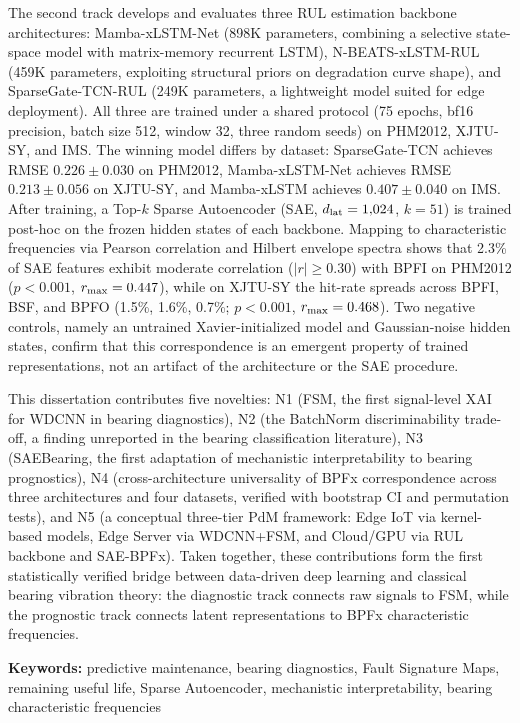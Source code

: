 \begin{abstracten}
The second track develops and evaluates three RUL estimation backbone
architectures: Mamba-xLSTM-Net (898K parameters, combining a selective
state-space model with matrix-memory recurrent LSTM), N-BEATS-xLSTM-RUL
(459K parameters, exploiting structural priors on degradation curve shape),
and SparseGate-TCN-RUL (249K parameters, a lightweight model suited for
edge deployment).
All three are trained under a shared protocol (75 epochs, bf16 precision,
batch size 512, window 32, three random seeds) on PHM2012, XJTU-SY, and
IMS.
The winning model differs by dataset: SparseGate-TCN achieves
RMSE $0.226 \pm 0.030$ on PHM2012, {\color{blue}Mamba-xLSTM-Net achieves
RMSE $0.213 \pm 0.056$ on XJTU-SY}, and Mamba-xLSTM achieves
$0.407 \pm 0.040$ on IMS.
After training, a Top-$k$ Sparse Autoencoder (SAE, $d_{\rm lat} = 1{,}024$,
$k = 51$) is trained post-hoc on the frozen hidden states of each backbone.
Mapping to characteristic frequencies via Pearson correlation and Hilbert
envelope spectra shows that 2.3\% of SAE features exhibit moderate
correlation ($|r| \geq 0.30$) with BPFI on PHM2012 ($p < 0.001$,
$r_{\rm max} = 0.447$), {\color{blue}while on XJTU-SY the hit-rate spreads across BPFI, BSF, and BPFO
(1.5\%, 1.6\%, 0.7\%; $p < 0.001$, $r_{\rm max} = 0.468$).}
Two negative controls, namely an untrained Xavier-initialized model and
Gaussian-noise hidden states, confirm that this correspondence is an
emergent property of trained representations, not an artifact of the
architecture or the SAE procedure.

This dissertation contributes five novelties: N1 (FSM, the first
signal-level XAI for WDCNN in bearing diagnostics), N2 (the BatchNorm
discriminability trade-off, a finding unreported in the bearing
classification literature), N3 (SAEBearing, the first adaptation of
mechanistic interpretability to bearing prognostics), N4 (cross-architecture
universality of BPFx correspondence across three architectures and four
datasets, verified with bootstrap CI and permutation tests), and N5 (a
conceptual three-tier PdM framework: Edge IoT via kernel-based models,
Edge Server via WDCNN+FSM, and Cloud/GPU via RUL backbone and SAE-BPFx).
Taken together, these contributions form the first statistically verified
bridge between data-driven deep learning and classical bearing vibration
theory: the diagnostic track connects raw signals to FSM, while the
prognostic track connects latent representations to BPFx characteristic
frequencies.

\bigskip\noindent
\textbf{Keywords:} predictive maintenance, bearing diagnostics, Fault
Signature Maps, remaining useful life, Sparse Autoencoder, mechanistic
interpretability, bearing characteristic frequencies

\end{abstracten}
